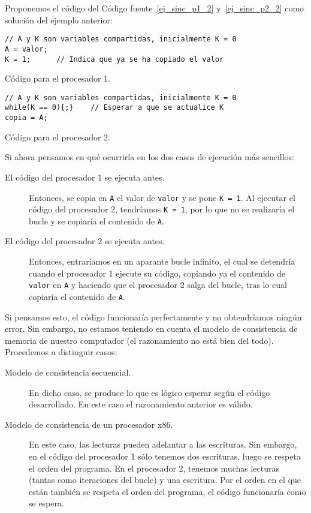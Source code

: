 \begin{ejemplo}
    Proponemos el código del Código fuente~\ref{ej_sinc_p1_2} y~\ref{ej_sinc_p2_2} como solución del ejemplo anterior:
\begin{listing}[H]
\centering
\begin{verbatim}
// A y K son variables compartidas, inicialmente K = 0
A = valor; 
K = 1;      // Indica que ya se ha copiado el valor
\end{verbatim}
\caption{Código para el procesador 1.}
\label{ej_sinc_p1_2}
\end{listing}

\begin{listing}[H]
\centering
\begin{verbatim}
// A y K son variables compartidas, inicialmente K = 0
while(K == 0){;}    // Esperar a que se actualice K
copia = A;
\end{verbatim}
\caption{Código para el procesador 2.}
\label{ej_sinc_p2_2}
\end{listing}
Si ahora pensamos en qué ocurriría en los dos casos de ejecución más sencillos:
\begin{description}
    \item [El código del procesador 1 se ejecuta antes.] Entonces, se copia en \verb|A| el valor de \verb|valor| y se pone \verb|K = 1|. Al ejecutar el código del procesador 2, tendríamos \verb|K = 1|, por lo que no se realizaría el bucle y se copiaría el contenido de \verb|A|.
    \item [El código del procesador 2 se ejecuta antes.] Entonces, entraríamos en un aparante bucle infinito, el cual se detendría cuando el procesador 1 ejecute su código, copiando ya el contenido de \verb|valor| en \verb|A| y haciendo que el procesador 2 salga del bucle, tras lo cual copiaría el contenido de \verb|A|.
\end{description}
Si pensamos esto, el código funcionaría perfectamente y no obtendríamos ningún error. Sin embargo, no estamos teniendo en cuenta el modelo de consistencia de memoria de nuestro computador (el razonamiento no está bien del todo). Procedemos a distinguir casos:
\begin{description}
    \item [Modelo de consistencia secuencial.] En dicho caso, se produce lo que es lógico esperar según el código desarrollado. En este caso el razonamiento anterior es válido.
    \item [Modelo de consistencia de un procesador x86.] En este caso, las lecturas pueden adelantar a las escrituras. Sin embargo, en el código del procesador 1 sólo tenemos dos escrituras, luego se respeta el orden del programa. En el procesador 2, tenemos muchas lecturas (tantas como iteraciones del bucle) y una escritura. Por el orden en el que están también se respeta el orden del programa, el código funcionaría como se espera.

\end{description}
\end{ejemplo}
